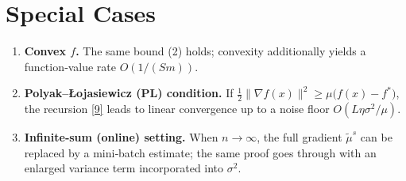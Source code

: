\documentclass{article}
\begin{document}
\section*{Special Cases}
\begin{enumerate}
\item \textbf{Convex $f$.} The same bound (2) holds; convexity additionally yields a function‑value rate $O(1/(Sm))$.
\item \textbf{Polyak–Łojasiewicz (PL) condition.} If $\frac12\|\nabla f(x)\|^{2}\ge\mu\big(f(x)-f^{*}\big)$, the recursion \eqref{9} leads to linear convergence up to a noise floor $O(L\eta\sigma^{2}/\mu)$.
\item \textbf{Infinite‑sum (online) setting.} When $n\to\infty$, the full gradient $\tilde{\mu}^{s}$ can be replaced by a mini‑batch estimate; the same proof goes through with an enlarged variance term incorporated into $\sigma^{2}$.
\end{enumerate}

\end{document}
